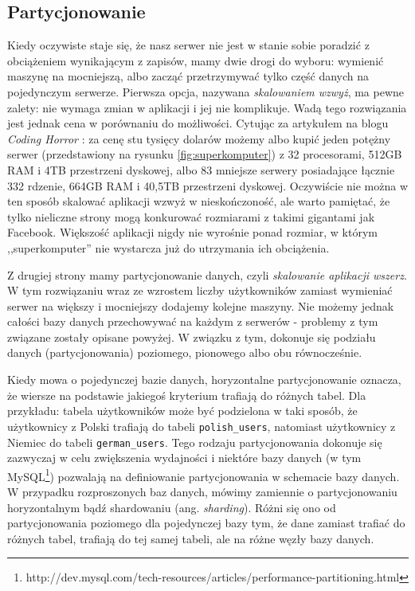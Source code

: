 \subsection{Partycjonowanie}
Kiedy oczywiste staje się, że nasz serwer nie jest w stanie sobie poradzić z obciążeniem wynikającym z zapisów, mamy dwie drogi do wyboru: wymienić maszynę na mocniejszą, albo zacząć przetrzymywać tylko część danych na pojedynczym serwerze.
Pierwsza opcja, nazywana \emph{skalowaniem wzwyż}, ma pewne zalety: nie wymaga zmian w aplikacji i jej nie komplikuje.
Wadą tego rozwiązania jest jednak cena w porównaniu do możliwości.
Cytując za artykułem na blogu \emph{Coding Horror} \cite{codinghorror-scaling-up-vs-out}: za cenę stu tysięcy dolarów możemy albo kupić jeden potężny serwer (przedstawiony na rysunku \ref{fig:superkomputer}) z 32 procesorami, 512GB RAM i 4TB przestrzeni dyskowej, albo 83 mniejsze serwery posiadające łącznie 332 rdzenie, 664GB RAM i 40,5TB przestrzeni dyskowej.
Oczywiście nie można w ten sposób skalować aplikacji wzwyż w nieskończoność, ale warto pamiętać, że tylko nieliczne strony mogą konkurować rozmiarami z takimi gigantami jak Facebook.
Większość aplikacji nigdy nie wyrośnie ponad rozmiar, w którym ,,superkomputer'' nie wystarcza już do utrzymania ich obciążenia.


Z drugiej strony mamy partycjonowanie danych, czyli \emph{skalowanie aplikacji wszerz}.
W tym rozwiązaniu wraz ze wzrostem liczby użytkowników zamiast wymieniać serwer na większy i mocniejszy dodajemy kolejne maszyny.
Nie możemy jednak całości bazy danych przechowywać na każdym z serwerów - problemy z tym związane zostały opisane powyżej.
W związku z tym, dokonuje się podziału danych (partycjonowania) poziomego, pionowego albo obu równocześnie.

Kiedy mowa o pojedynczej bazie danych, horyzontalne partycjonowanie oznacza, że wiersze na podstawie jakiegoś kryterium trafiają do różnych tabel.
Dla przykładu: tabela użytkowników może być podzielona w taki sposób, że użytkownicy z Polski trafiają do tabeli \verb=polish_users=, natomiast użytkownicy z Niemiec do tabeli \verb=german_users=.
Tego rodzaju partycjonowania dokonuje się zazwyczaj w celu zwiększenia wydajności i niektóre bazy danych (w tym MySQL\footnote{http://dev.mysql.com/tech-resources/articles/performance-partitioning.html}) pozwalają na definiowanie partycjonowania w schemacie bazy danych.
W przypadku rozproszonych baz danych, mówimy zamiennie o partycjonowaniu horyzontalnym bądź shardowaniu (ang. \emph{sharding}).
Różni się ono od partycjonowania poziomego dla pojedynczej bazy tym, że dane zamiast trafiać do różnych tabel, trafiają do tej samej tabeli, ale na różne węzły bazy danych.


